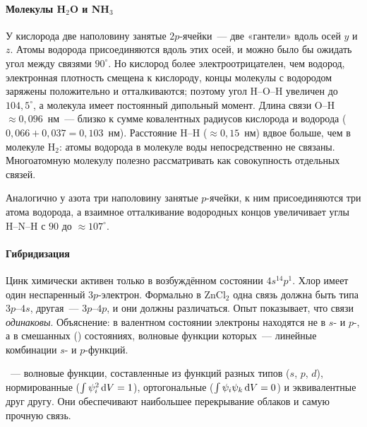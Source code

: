 \paragraph{Молекулы H$_2$O и NH$_3$}
У кислорода две наполовину занятые $2p$-ячейки~— две «гантели» вдоль осей
$y$ и $z$. Атомы водорода присоединяются вдоль этих осей, и можно было бы
ожидать угол между связями $90^\circ$. Но кислород более
электроотрицателен, чем водород, электронная плотность смещена к
кислороду, концы молекулы с водородом заряжены положительно и
отталкиваются; поэтому угол H--O--H увеличен до $104{,}5^\circ$, а
молекула имеет постоянный дипольный момент. Длина связи O--H
$\approx0{,}096$~нм~— близко к сумме ковалентных
радиусов кислорода и водорода ($0{,}066+0{,}037=0{,}103$~нм). Расстояние
H--H ($\approx0{,}15$~нм) вдвое больше, чем в молекуле H$_2$: атомы водорода
в молекуле воды непосредственно не связаны. Многоатомную молекулу
полезно рассматривать как совокупность отдельных связей.

Аналогично у азота три наполовину занятые $p$-ячейки, к ним присоединяются
три атома водорода, а взаимное отталкивание водородных концов
увеличивает углы H--N--H с $90$ до $\approx107^\circ$.

\paragraph{Гибридизация}
Цинк химически активен только в возбуждённом состоянии $4s^14p^1$. Хлор
имеет один неспаренный $3p$-электрон. Формально в ZnCl$_2$ одна связь
должна быть типа $3p$--$4s$, другая~— $3p$--$4p$, и они должны различаться.
Опыт показывает, что связи \emph{одинаковы}. Объяснение: в валентном
состоянии электроны находятся не в $s$- и $p$-, а в смешанных
() состояниях, волновые функции которых~— линейные
комбинации $s$- и $p$-функций.

\begin{opredelenie}
~— волновые функции, составленные из функций
разных типов ($s$, $p$, $d$), нормированные ($\int\psi_i^2\mathop{}\!\mathrm{d} V=1$),
ортогональные ($\int\psi_i\psi_k\mathop{}\!\mathrm{d} V=0$) и эквивалентные друг другу.
Они обеспечивают наибольшее перекрывание облаков и самую прочную связь.
\end{opredelenie}

